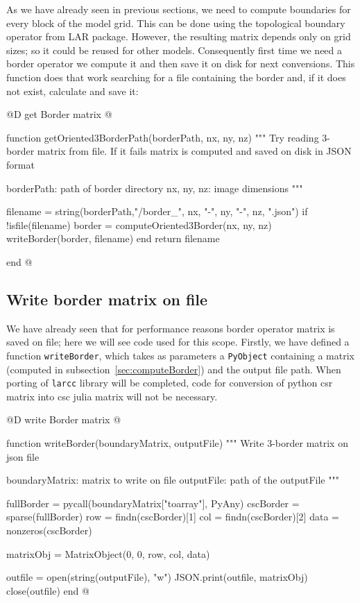 \documentclass[11pt,oneside]{article}	%
\begin{document}
As we have already seen in previous sections, we need to compute boundaries for every block of the model grid. This can be done using the topological boundary operator from LAR package. However, the resulting matrix depends only on grid sizes; so it could be reused for other models. Consequently first time we need a border operator we compute it and then save it on disk for next conversions. This function does that work searching for a file containing the border and, if it does not exist, calculate and save it: 

@D get Border matrix
@{function getOriented3BorderPath(borderPath, nx, ny, nz)
  """
  Try reading 3-border matrix from file. If it fails matrix
  is computed and saved on disk in JSON format

  borderPath: path of border directory
  nx, ny, nz: image dimensions
  """

  filename = string(borderPath,"/border_", nx, "-", ny, "-", nz, ".json")
  if !isfile(filename)
    border = computeOriented3Border(nx, ny, nz)
    writeBorder(border, filename)
  end
  return filename

end @}

\subsection{Write border matrix on file}\label{sec:writeBorderMatrix}

We have already seen that for performance reasons border operator matrix is saved on file; here we will see code used for this scope. Firstly, we have defined a function \texttt{writeBorder}, which takes as parameters a \texttt{PyObject} containing a matrix (computed in subsection~\ref{sec:computeBorder}) and the output file path. When porting of \texttt{larcc} library will be completed, code for conversion of python csr matrix into csc julia matrix will not be necessary.

@D write Border matrix
@{function writeBorder(boundaryMatrix, outputFile)
  """
  Write 3-border matrix on json file

  boundaryMatrix: matrix to write on file
  outputFile: path of the outputFile
  """

  fullBorder = pycall(boundaryMatrix["toarray"], PyAny)
  cscBorder = sparse(fullBorder)
  row = findn(cscBorder)[1]
  col = findn(cscBorder)[2]
  data = nonzeros(cscBorder)

  matrixObj = MatrixObject(0, 0, row, col, data)

  outfile = open(string(outputFile), "w")
  JSON.print(outfile, matrixObj)
  close(outfile)
end @}
\end{document}
